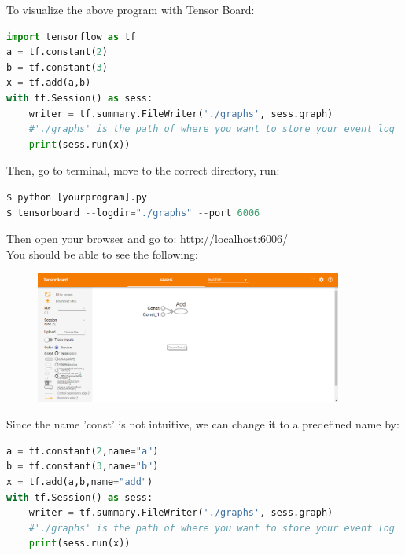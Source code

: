 \documentclass{article}
\begin{document}
	\noindent To visualize the above program with Tensor Board:
\begin{lstlisting}[language=Python,morekeywords ={as}]
import tensorflow as tf
a = tf.constant(2)
b = tf.constant(3)
x = tf.add(a,b)
with tf.Session() as sess:
	writer = tf.summary.FileWriter('./graphs', sess.graph)
	#'./graphs' is the path of where you want to store your event log
	print(sess.run(x))
\end{lstlisting}	
	Then, go to terminal, move to the correct directory, run:
\begin{lstlisting}[numbers=none,language=Python]
$ python [yourprogram].py
$ tensorboard --logdir="./graphs" --port 6006
\end{lstlisting}
	Then open your browser and go to: \url{http://localhost:6006/}\\
	You should be able to see the following:
	\begin{figure}[H]
		\centering
		\includegraphics[width = 0.9\textwidth]{tensorboard.png}
	\end{figure}
	\noindent Since the name 'const' is not intuitive, we can change it to a predefined name by:
\begin{lstlisting}[language=Python,morekeywords ={as}]
a = tf.constant(2,name="a")
b = tf.constant(3,name="b")
x = tf.add(a,b,name="add")
with tf.Session() as sess:
	writer = tf.summary.FileWriter('./graphs', sess.graph)
	#'./graphs' is the path of where you want to store your event log
	print(sess.run(x))
\end{lstlisting}
	\medskip
\end{document}
